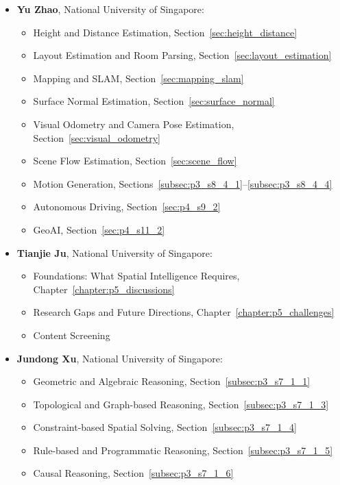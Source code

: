 \begin{itemize}[leftmargin=*]
\begin{itemize}
        \end{itemize}
    \item \textbf{Yu Zhao}, National University of Singapore:
        \begin{itemize}
            \item Height and Distance Estimation, Section~\ref{sec:height_distance}
            \item Layout Estimation and Room Parsing, Section~\ref{sec:layout_estimation}
            \item Mapping and SLAM, Section~\ref{sec:mapping_slam}
            \item Surface Normal Estimation, Section~\ref{sec:surface_normal}
            \item Visual Odometry and Camera Pose Estimation, Section~\ref{sec:visual_odometry}
            \item Scene Flow Estimation, Section~\ref{sec:scene_flow}
            \item Motion Generation, Sections~\ref{subsec:p3_s8_4_1}--\ref{subsec:p3_s8_4_4}
            \item Autonomous Driving, Section~\ref{sec:p4_s9_2}
            \item GeoAI, Section~\ref{sec:p4_s11_2}
        \end{itemize}
    \item \textbf{Tianjie Ju}, National University of Singapore:
        \begin{itemize}
            \item Foundations: What Spatial Intelligence Requires, Chapter~\ref{chapter:p5_discussions}
            \item Research Gaps and Future Directions, Chapter~\ref{chapter:p5_challenges}
            \item Content Screening
        \end{itemize}
    \item \textbf{Jundong Xu}, National University of Singapore:
        \begin{itemize}
            \item Geometric and Algebraic Reasoning, Section~\ref{subsec:p3_s7_1_1}
            \item Topological and Graph-based Reasoning, Section~\ref{subsec:p3_s7_1_3}
            \item Constraint-based Spatial Solving, Section~\ref{subsec:p3_s7_1_4}
            \item Rule-based and Programmatic Reasoning, Section~\ref{subsec:p3_s7_1_5}
            \item Causal Reasoning, Section~\ref{subsec:p3_s7_1_6}

\end{itemize}
\end{itemize}
